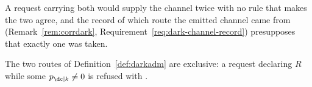 
A request carrying both would supply the channel twice with no rule that makes
the two agree, and the record of which route the emitted channel came from
(Remark~\ref{rem:corrdark}, Requirement~\ref{req:dark-channel-record})
presupposes that exactly one was taken.

\begin{requirement}\label{req:dark-route-exclusive}
The two routes of Definition~\ref{def:darkadm} are exclusive: a request
declaring $R$ while some $p_{\dc|k}\neq0$ is refused with
.
\end{requirement}
